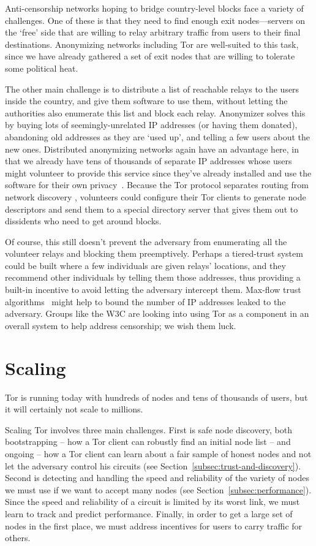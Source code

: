 \documentclass{llncs}
\begin{document}
Anti-censorship networks hoping to bridge country-level blocks face
a variety of challenges. One of these is that they need to find enough
exit nodes---servers on the `free' side that are willing to relay
arbitrary traffic from users to their final destinations. Anonymizing
networks including Tor are well-suited to this task, since we have
already gathered a set of exit nodes that are willing to tolerate some
political heat.

The other main challenge is to distribute a list of reachable relays
to the users inside the country, and give them software to use them,
without letting the authorities also enumerate this list and block each
relay. Anonymizer solves this by buying lots of seemingly-unrelated IP
addresses (or having them donated), abandoning old addresses as they are
`used up', and telling a few users about the new ones. Distributed
anonymizing networks again have an advantage here, in that we already
have tens of thousands of separate IP addresses whose users might
volunteer to provide this service since they've already installed and use
the software for their own privacy~\cite{koepsell:wpes2004}. Because
the Tor protocol separates routing from network discovery \cite{tor-design},
volunteers could configure their Tor clients
to generate node descriptors and send them to a special directory
server that gives them out to dissidents who need to get around blocks.

Of course, this still doesn't prevent the adversary
from enumerating all the volunteer relays and blocking them preemptively.
Perhaps a tiered-trust system could be built where a few individuals are
given relays' locations, and they recommend other individuals by telling them
those addresses, thus providing a built-in incentive to avoid letting the
adversary intercept them. Max-flow trust algorithms~\cite{advogato}
might help to bound the number of IP addresses leaked to the adversary. Groups
like the W3C are looking into using Tor as a component in an overall system to
help address censorship; we wish them luck.


\section{Scaling}
\label{sec:scaling}

Tor is running today with hundreds of nodes and tens of thousands of
users, but it will certainly not scale to millions.

Scaling Tor involves three main challenges.  First is safe node
discovery, both bootstrapping -- how a Tor client can robustly find an
initial node list -- and ongoing -- how a Tor client can learn about
a fair sample of honest nodes and not let the adversary control his
circuits (see Section~\ref{subsec:trust-and-discovery}).  Second is detecting and handling the speed
and reliability of the variety of nodes we must use if we want to
accept many nodes (see Section~\ref{subsec:performance}).
Since the speed and reliability of a circuit is limited by its worst link,
we must learn to track and predict performance.  Finally, in order to get
a large set of nodes in the first place, we must address incentives
for users to carry traffic for others.
\end{document}

